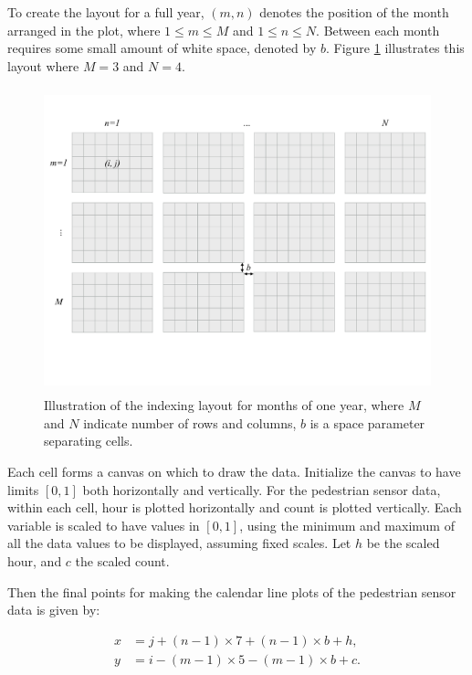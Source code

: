 \documentclass[12pt]{article}
\begin{document}
To create the layout for a full year, \((m, n)\) denotes the position of
the month arranged in the plot, where \(1 \le m \le M\) and
\(1 \le n \le N\). Between each month requires some small amount of
white space, denoted by \(b\). Figure \ref{fig:year-diagram} illustrates
this layout where \(M = 3\) and \(N = 4\).

\begin{figure}

{\centering \includegraphics[width=360pt,height=250pt]{img/year-diagram} 

}

\caption{Illustration of the indexing layout for months of one year, where $M$ and $N$ indicate number of rows and columns, $b$ is a space parameter separating cells.}\label{fig:year-diagram}
\end{figure}

Each cell forms a canvas on which to draw the data. Initialize the
canvas to have limits \([0, 1]\) both horizontally and vertically. For
the pedestrian sensor data, within each cell, hour is plotted
horizontally and count is plotted vertically. Each variable is scaled to
have values in \([0,1]\), using the minimum and maximum of all the data
values to be displayed, assuming fixed scales. Let \(h\) be the scaled
hour, and \(c\) the scaled count.

Then the final points for making the calendar line plots of the
pedestrian sensor data is given by:

\begin{equation}
  \begin{aligned}
  x &= j + (n - 1) \times 7 + (n - 1) \times b + h, \\
  y &= i - (m - 1) \times 5 - (m - 1) \times b + c. \label{eq:final}
  \end{aligned}
\end{equation}
\end{document}
